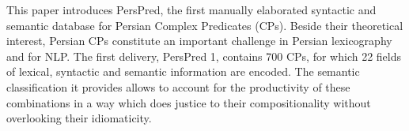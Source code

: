 This paper introduces PersPred, the first manually elaborated syntactic and semantic database for Persian Complex Predicates (CPs). Beside their
 theoretical interest, Persian CPs constitute an important challenge in Persian
 lexicography and for NLP. The first delivery, PersPred 1, contains 700 CPs, for
 which 22 fields of lexical, syntactic and semantic information are encoded. The
 semantic classification it provides allows to account for the productivity of
 these combinations in a way which does justice to their compositionality
 without overlooking their idiomaticity.


